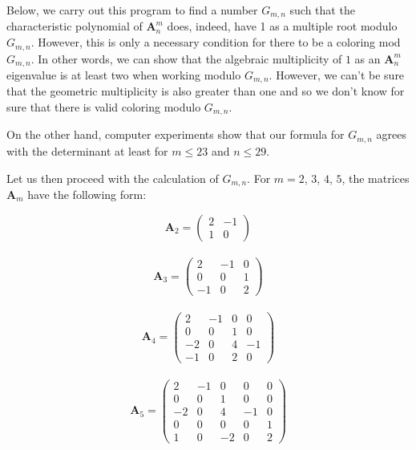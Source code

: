 \documentclass{amsart}
\begin{document}
Below, we carry out this program to find a number $G_{m,n}$ such that 
the characteristic polynomial of ${{\mathbf A}}_n^m$ does, indeed, have 1
as a multiple root modulo $G_{m,n}$. However, this is only a necessary condition for
there to be a coloring mod $G_{m,n}$. In other words, we can show that the algebraic 
multiplicity of $1$ as an ${{\mathbf A}}_n^m$ eigenvalue is at least two when working modulo 
$G_{m,n}$. However, we can't be sure that the geometric multiplicity is
also greater than one and so we don't know for sure that there is valid coloring modulo $G_{m,n}$. 

On the other hand, computer experiments show that our formula for $G_{m,n}$ agrees with the determinant at least for $m \leq 23$ and $n \leq 29$.

Let us then proceed with the calculation of $G_{m,n}$.
For $m=2$, $3$, $4$, $5$, the matrices ${{\mathbf A}}_m$ have the following form:

\begin{displaymath}
{{\mathbf A}}_2 = \left( \begin{array}{cc}
    2&-1\\
    1&0
\end{array} \right)
\end{displaymath}\\

\begin{displaymath}
{{\mathbf A}}_3 = \left( \begin{array}{ccc}
    2&-1&0\\
    0&0&1\\
    -1&0&2
\end{array} \right)
\end{displaymath}\\

\begin{displaymath}
{{\mathbf A}}_4 = \left( \begin{array}{cccc}
    2&-1&0&0\\
    0&0&1&0\\
    -2&0&4&-1\\
    -1&0&2&0
\end{array} \right)
\end{displaymath}\\

\begin{displaymath}
{{\mathbf A}}_5 = \left( \begin{array}{ccccc}
    2&-1&0&0&0\\
    0&0&1&0&0\\
    -2&0&4&-1&0\\
    0&0&0&0&1\\
    1&0&-2&0&2
\end{array} \right)
\end{displaymath}\\
\end{document}
